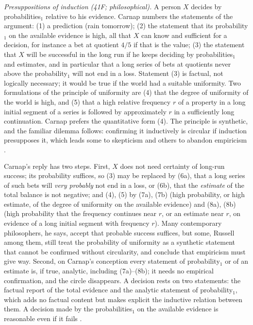 \emph{Presuppositions of induction (41F; philosophical).} A person
\(X\) decides by probabilities\(_1\) relative to his evidence. Carnap
numbers the statements of the argument:
(1) a prediction (rain tomorrow);
(2) the statement that its probability\(_1\) on the available evidence
is high, all that \(X\) can know and sufficient for a decision, for
instance a bet at quotient \(4/5\) if that is the value;
(3) the statement that \(X\) will be successful in the long run if he
keeps deciding by probabilities\(_1\) and estimates, and in particular
that a long series of bets at quotients never above the
probability\(_1\) will not end in a loss.
Statement (3) is factual, not logically necessary; it would be true if
the world had a suitable uniformity. Two formulations of the principle
of uniformity are (4) that the degree of uniformity of the world is
high, and (5) that a high relative frequency \(r\) of a property in a
long initial segment of a series is followed by approximately \(r\) in a
sufficiently long continuation. Carnap prefers the quantitative form
(4). The principle is synthetic, and the familiar dilemma follows:
confirming it inductively is circular if induction presupposes it,
which leads some to skepticism and others to abandon empiricism
\cite[sec.~41F, pp.~177--179]{Carnap1950Probability}.

Carnap's reply has two steps. First, \(X\) does not need certainty of
long-run success; its probability suffices, so (3) may be replaced by
(6a), that a long series of such bets will \emph{very probably} not end
in a loss, or (6b), that the \emph{estimate} of the total balance is
not negative; and (4), (5) by (7a), (7b) (high probability, or high
estimate, of the degree of uniformity on the available evidence) and
(8a), (8b) (high probability that the frequency continues near \(r\),
or an estimate near \(r\), on evidence of a long initial segment with
frequency \(r\)). Many contemporary philosophers, he says, accept that
probable success suffices, but some, Russell among them, still treat
the probability of uniformity as a synthetic statement that cannot be
confirmed without circularity, and conclude that empiricism must give
way. Second, on Carnap's conception every statement of
probability\(_1\) or of an estimate is, if true, analytic, including
(7a)--(8b); it needs no empirical confirmation, and the circle
disappears. A decision rests on two statements: the factual report of
the total evidence and the analytic statement of probability\(_1\),
which adds no factual content but makes explicit the inductive relation
between them. A decision made by the probabilities\(_1\) on the
available evidence is reasonable even if it fails
\cite[sec.~41F, pp.~179--181]{Carnap1950Probability}.

